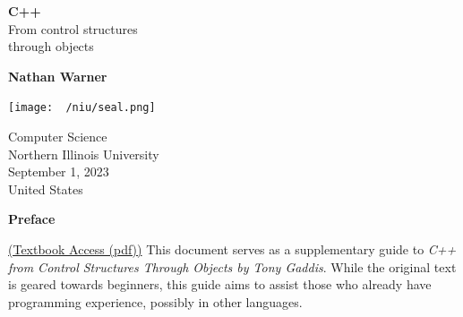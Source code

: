 \documentclass{report}
\title{\Huge{}}
\author{\huge{Nathan Warner}}
\date{\huge{}}
\begin{document}
        \begin{titlepage}
       \begin{center}
           \vspace*{1cm}
    
           \textbf{C++} \\
           From control structures  \\ through objects
    
           \vspace{0.5cm}
            
                
           \vspace{1.5cm}
    
           \textbf{Nathan Warner}
    
           \vfill
                
                
           \vspace{0.8cm}
         
           \texttt{[image: ~/niu/seal.png]}
                
           Computer Science \\
           Northern Illinois University\\
           September 1, 2023 \\
           United States\\
           
                
       \end{center}
    \end{titlepage}
    \tableofcontents
    \pagebreak \bigbreak \noindent
    \begin{center}
        \begin{Huge}
           \textbf{Preface} 
        \end{Huge}
    \end{center}
    \bigbreak \noindent 
    \sepline
    \bigbreak \noindent 
    \href{https://github.com/JiaRuiShao/CPP/blob/master/Starting%20Out%20with%20C%2B%2B%20from%20Control%20Structures%20to%20Objects%208%20Tony%20Gaddis.pdf}{(Textbook Access (pdf))}
    \bigbreak \noindent 
    This document serves as a supplementary guide to \textit{C++ from Control Structures Through Objects by Tony Gaddis}. While the original text is geared towards beginners, this guide aims to assist those who already have programming experience, possibly in other languages.
\end{document}
